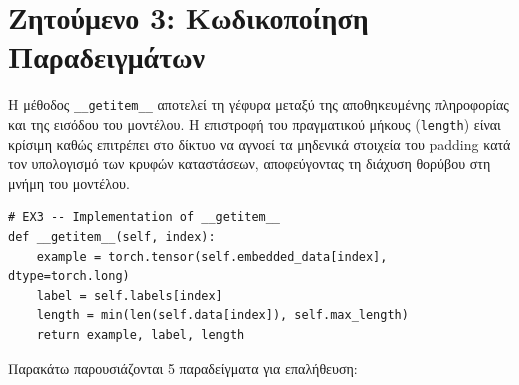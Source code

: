 \documentclass[12pt]{article}
\begin{document}
\section{Ζητούμενο 3: Κωδικοποίηση Παραδειγμάτων}

Η μέθοδος \texttt{\_\_getitem\_\_} αποτελεί τη γέφυρα μεταξύ της αποθηκευμένης πληροφορίας και της εισόδου του μοντέλου. Η επιστροφή του πραγματικού μήκους (\texttt{length}) είναι κρίσιμη καθώς επιτρέπει στο δίκτυο να αγνοεί τα μηδενικά στοιχεία του padding κατά τον υπολογισμό των κρυφών καταστάσεων, αποφεύγοντας τη διάχυση θορύβου στη μνήμη του μοντέλου.

\begin{lstlisting}
# EX3 -- Implementation of __getitem__
def __getitem__(self, index):
    example = torch.tensor(self.embedded_data[index], dtype=torch.long)
    label = self.labels[index]
    length = min(len(self.data[index]), self.max_length)
    return example, label, length
\end{lstlisting}

Παρακάτω παρουσιάζονται 5 παραδείγματα για επαλήθευση:
\end{document}
